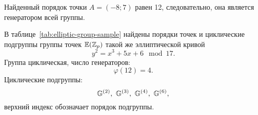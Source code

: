 Найденный порядок точки $A = (-8; 7)$ равен 12, следовательно, она является генератором всей группы.

В таблице~\ref{tab:elliptic-group-sample} найдены порядки точек и циклические подгруппы группы точек $\mathbb{E}(\mathbb{Z}_p)$ такой же эллиптической кривой
    \[ y^2 = x^3 + 5 x + 6 \mod 17. \]
Группа циклическая, число генераторов:
    \[ \varphi(12) = 4. \]
Циклические подгруппы:
    \[ \mathbb{G}^{(2)}, ~ \mathbb{G}^{(3)}, ~ \mathbb{G}^{(4)}, ~ \mathbb{G}^{(6)}, \]
верхний индекс обозначает порядок подгруппы.

\begin{table}[!ht]
    \centering
    \caption{Генераторы и циклические подгруппы группы точек эллиптической кривой\label{tab:elliptic-group-sample}}
\end{table}
